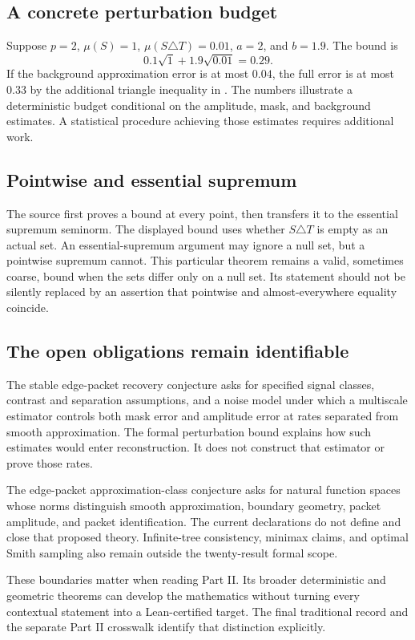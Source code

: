 \subsection{A concrete perturbation budget}
\begin{microexample}[title={An amplitude and mask budget}]
Suppose $p=2$, $\mu(S)=1$, $\mu(S\triangle T)=0.01$, $a=2$, and $b=1.9$. The bound is
\[
0.1\sqrt1+1.9\sqrt{0.01}=0.29.
\]
If the background approximation error is at most $0.04$, the full error is at most $0.33$ by the additional triangle inequality in . The numbers illustrate a deterministic budget conditional on the amplitude, mask, and background estimates. A statistical procedure achieving those estimates requires additional work.

\end{microexample}

\subsection{Pointwise and essential supremum}
The source first proves a bound at every point, then transfers it to the essential supremum seminorm.
The displayed bound uses whether $S\triangle T$ is empty as an actual set. An essential-supremum argument may ignore a null set, but a pointwise supremum cannot. This particular theorem remains a valid, sometimes coarse, bound when the sets differ only on a null set. Its statement should not be silently replaced by an assertion that pointwise and almost-everywhere equality coincide.

\subsection{The open obligations remain identifiable}
The stable edge-packet recovery conjecture asks for specified signal classes, contrast and separation assumptions, and a noise model under which a multiscale estimator controls both mask error and amplitude error at rates separated from smooth approximation. The formal perturbation bound explains how such estimates would enter reconstruction. It does not construct that estimator or prove those rates.

The edge-packet approximation-class conjecture asks for natural function spaces whose norms distinguish smooth approximation, boundary geometry, packet amplitude, and packet identification. The current declarations do not define and close that proposed theory. Infinite-tree consistency, minimax claims, and optimal Smith sampling also remain outside the twenty-result formal scope.

These boundaries matter when reading Part II. Its broader deterministic and geometric theorems can develop the mathematics without turning every contextual statement into a Lean-certified target. The final traditional record and the separate Part II crosswalk identify that distinction explicitly.
